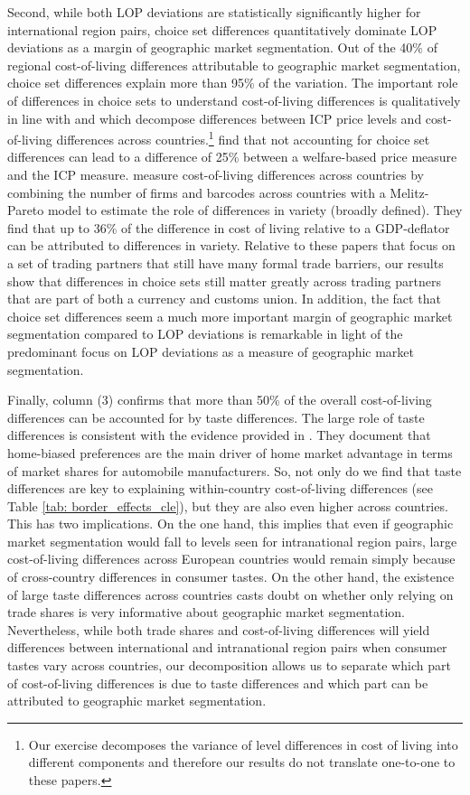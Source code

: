 Second, while both LOP deviations are statistically significantly higher for international region pairs, choice set differences quantitatively dominate LOP deviations as a margin of geographic market segmentation. Out of the 40\% of regional cost-of-living differences attributable to geographic market segmentation, choice set differences explain more than 95\% of the variation. The important role of differences in choice sets to understand cost-of-living differences is qualitatively in line with \citet{Argente2021} and \citet{Cavallo2022} which decompose differences between ICP price levels and cost-of-living differences across countries.\footnote{Our exercise decomposes the variance of level differences in cost of living into different components and therefore our results do not translate one-to-one to these papers.} \citet{Argente2021} find that not accounting for choice set differences can lead to a difference of 25\% between a welfare-based price measure and the ICP measure. \citet{Cavallo2022} measure cost-of-living differences across countries by combining the number of firms and barcodes across countries with a Melitz-Pareto model to estimate the role of differences in variety (broadly defined). They find that up to 36\% of the difference in cost of living relative to a GDP-deflator can be attributed to differences in variety. Relative to these papers that focus on a set of trading partners that still have many formal trade barriers, our results show that differences in choice sets still matter greatly across trading partners that are part of both a currency and customs union. In addition, the fact that choice set differences seem a much more important margin of geographic market segmentation compared to LOP deviations is remarkable in light of the predominant focus on LOP deviations as a measure of geographic market segmentation.

Finally, column (3) confirms that more than 50\% of the overall cost-of-living differences can be accounted for by taste differences. The large role of taste differences is consistent with the evidence provided in \citet{Cosar2018}. They document that home-biased preferences are the main driver of home market advantage in terms of market shares for automobile manufacturers. So, not only do we find that taste differences are key to explaining within-country cost-of-living differences (see Table \ref{tab: border_effects_cle}), but they are also even higher across countries. This has two implications. On the one hand, this implies that even if geographic market segmentation would fall to levels seen for intranational region pairs, large cost-of-living differences across European countries would remain simply because of cross-country differences in consumer tastes. On the other hand, the existence of large taste differences across countries casts doubt on whether only relying on trade shares is very informative about geographic market segmentation. Nevertheless, while both trade shares and cost-of-living differences will yield differences between international and intranational region pairs when consumer tastes vary across countries, our decomposition allows us to separate which part of cost-of-living differences is due to taste differences and which part can be attributed to geographic market segmentation. 

